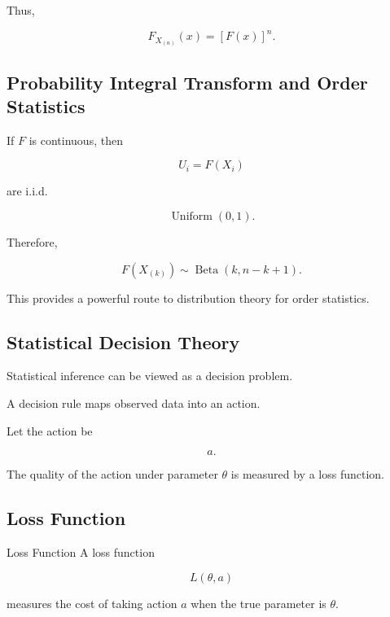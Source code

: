 Thus,

\[
\boxed{
F_{X_{(n)}}(x)
=
[F(x)]^n.
}
\]

\subsection{Probability Integral Transform and Order Statistics}
\label{subsec:pit-order-statistics}

If \(F\) is continuous, then

\[
U_i
=
F(X_i)
\]

are i.i.d.

\[
\operatorname{Uniform}(0,1).
\]

Therefore,

\[
\boxed{
F
(
X_{(k)}
)
\sim
\operatorname{Beta}
(
k,
n-k+1
).
}
\]

This provides a powerful route to distribution theory for order
statistics.

\subsection{Statistical Decision Theory}
\label{subsec:statistical-decision-theory}

Statistical inference can be viewed as a decision problem.

A decision rule maps observed data into an action.

Let the action be

\[
a.
\]

The quality of the action under parameter \(\theta\) is measured by a
loss function.

\subsection{Loss Function}
\label{subsec:loss-function}

\begin{definitionbox}{Loss Function}
A loss function

\[
\boxed{
L(\theta,a)
}
\]

measures the cost of taking action \(a\) when the true parameter is
\(\theta\).
\end{definitionbox}

